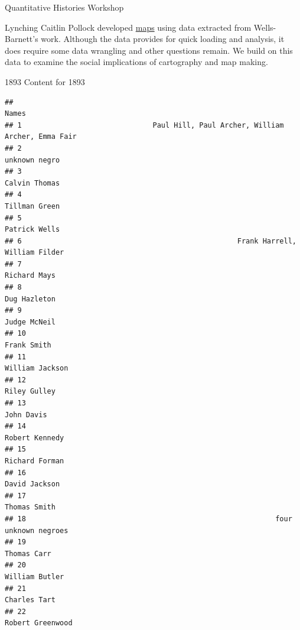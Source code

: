 \documentclass[
  ignorenonframetext,
]{beamer}
\begin{document}
\begin{frame}[fragile]{Quantitative Histories Workshop}
\begin{block}{Lynching}
\protect\hypertarget{lynching}{}
Caitlin Pollock developed \href{https://redrecord.cmjpollock.com/}{maps}
using data extracted from Wells-Barnett's work. Although the data
provides for quick loading and analysis, it does require some data
wrangling and other questions remain. We build on this data to examine
the social implications of cartography and map making.

\begin{block}{1893}
\protect\hypertarget{section}{}
Content for 1893

\begin{verbatim}
##                                                                             Names
## 1                               Paul Hill, Paul Archer, William Archer, Emma Fair
## 2                                                                   unknown negro
## 3                                                                   Calvin Thomas
## 4                                                                   Tillman Green
## 5                                                                   Patrick Wells
## 6                                                   Frank Harrell, William Filder
## 7                                                                    Richard Mays
## 8                                                                    Dug Hazleton
## 9                                                                    Judge McNeil
## 10                                                                    Frank Smith
## 11                                                                William Jackson
## 12                                                                   Riley Gulley
## 13                                                                     John Davis
## 14                                                                 Robert Kennedy
## 15                                                                 Richard Forman
## 16                                                                  David Jackson
## 17                                                                   Thomas Smith
## 18                                                           four unknown negroes
## 19                                                                    Thomas Carr
## 20                                                                 William Butler
## 21                                                                   Charles Tart
## 22                                                               Robert Greenwood

\end{verbatim}
\end{block}
\end{block}
\end{frame}
\end{document}
